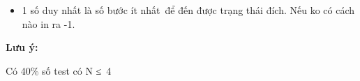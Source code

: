 \begin{itemize}
	\item     1 số duy nhất là số bước ít nhất để đến được trạng thái đích. Nếu ko có cách nào in ra -1.   
\end{itemize}

\textbf{     Lưu ý:    }

    Có 40\% số test có N ≤ 4